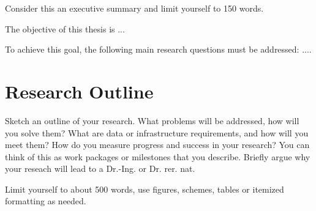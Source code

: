 \documentclass[11pt,DIV=16,parskip=half]{scrartcl}
\begin{document}
Consider this an executive summary and limit yourself to 150 words.

The objective of this thesis is ...

To achieve this goal, the following main research questions must be addressed: ....


\section{Research Outline}
Sketch an outline of your research.
What problems will be addressed, how will you solve them?
What are data or infrastructure requirements, and how will you meet them?
How do you measure progress and success in your research?
You can think of this as work packages or milestones that you describe.
Briefly argue why your reseach will lead to a Dr.-Ing. or Dr. rer. nat.

Limit yourself to about 500 words, use figures, schemes, tables or itemized formatting as needed.



\printbibliography
\end{document}
